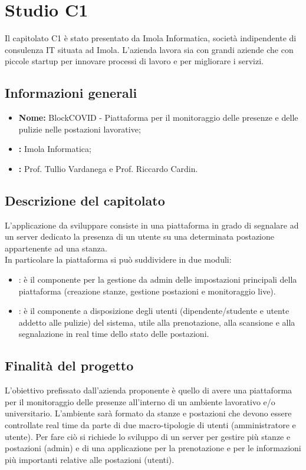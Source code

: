 \section{Studio C1} \label{_c1}
Il capitolato C1 è stato presentato da Imola Informatica, società indipendente di consulenza IT situata ad Imola. L'azienda lavora sia con grandi aziende che con piccole startup per innovare processi di lavoro e per migliorare i servizi.\\

\subsection{Informazioni generali}
\begin{itemize}
	\item \textbf{Nome:} BlockCOVID - Piattaforma per il monitoraggio delle presenze e delle pulizie nelle postazioni lavorative;
	\item \textbf{:} Imola Informatica;
	\item \textbf{:} Prof. Tullio Vardanega e Prof. Riccardo Cardin.
\end{itemize}

\subsection{Descrizione del capitolato}
L'applicazione da sviluppare consiste in una piattaforma in grado di segnalare ad un server dedicato la presenza di un utente su una determinata postazione appartenente ad una stanza. \\
In particolare la piattaforma si può suddividere in due moduli:
\begin{itemize}
	\item {}: è il componente per la gestione da admin delle impostazioni principali della piattaforma (creazione stanze, gestione postazioni e monitoraggio live).
	\item {}: è il componente a disposizione degli utenti (dipendente/studente e utente addetto alle pulizie) del sistema, utile alla prenotazione, alla scansione e alla segnalazione in real time dello stato delle postazioni.
\end{itemize}

\subsection{Finalità del progetto}
L'obiettivo prefissato dall'azienda proponente è quello di avere una piattaforma per il monitoraggio delle presenze all'interno di un ambiente lavorativo e/o universitario. L'ambiente sarà formato da stanze e postazioni che devono essere controllate real time da parte di due macro-tipologie di utenti (amministratore e utente). Per fare ciò si richiede lo sviluppo di un server per gestire più stanze e postazioni (admin) e di una applicazione per la prenotazione e per le informazioni più importanti relative alle postazioni (utenti).

